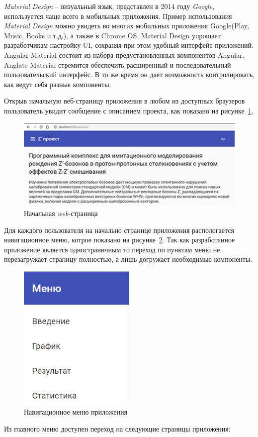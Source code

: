 \textit{Material Design} -- визуальный язык, представлен в 2014 году \textit{Google}, используется чаще всего в мобильных приложения. Пример использования \textit{Material Design} можно увидеть во многих мобильных приложения Google(Play, Music, Books и т.д.), а также в Chrome OS. Material Design упрощает разработчикам настройку UI, сохраняя при этом удобный интерфейс приложений. Angular Material состоит из набора предустановленных компонентов Angular. Anglate Material стремится обеспечить расширенный и последовательный пользовательский интерфейс. В то же время он дает возможность контролировать, как ведут себя разные компоненты.

Открыв начальную веб-страницу приложения в любом из доступных браузеров пользователь увидит сообщение с описанием проекта, как показано на рисунке~\ref{fig:welcome-page}.

\vspace{16pt}
\begin{figure}[!h]
	\centering
	\includegraphics[width=\textwidth]{figures/welcome-page.png}
	\caption{Начальная \textit{web}-страница}
	\label{fig:welcome-page}
\end{figure}

Для каждого пользователя на начально странице приложения распологается навигационное меню, котрое показано на рисунке~\ref{fig:menu}. Так как разработанное приложение является одностраничным то переход по пунктам меню не перезагружает страницу полностью, а лишь догружает необходимые компоненты.

\begin{figure}[!h]
	\centering
	\includegraphics[width=0.5\textwidth]{figures/menu.png}
	\caption{Навигационное меню приложения}
	\label{fig:menu}
\end{figure}
\vspace{5cm}
Из главного меню доступен переход на следующие страницы приложения: 

